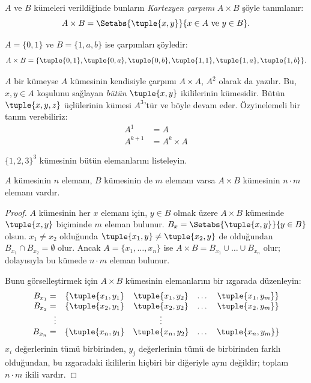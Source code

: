 \begin{defn}
$A$ ve $B$ kümeleri verildiğinde bunların \emph{Kartezyen çarpımı}
$A \times B$ şöyle tanımlanır:
\[
  A \times B = \Setabs{\tuple{x, y}}{x \in A \text{ ve } y \in B}.
\]
\end{defn}

\begin{ex}
$A = \{0, 1\}$ ve $B = \{1, a, b\}$ ise çarpımları şöyledir:
\[
A \times B = \{ \tuple{0, 1}, \tuple{0, a}, \tuple{0, b},
    \tuple{1, 1}, \tuple{1, a}, \tuple{1, b} \}.
\]
\end{ex}

\begin{ex}
$A$ bir kümeyse $A$ kümesinin kendisiyle çarpımı $A \times A$, $A^2$ olarak da
yazılır. Bu, $x, y \in A$ koşulunu sağlayan \emph{bütün}
$\tuple{x, y}$ ikililerinin kümesidir. Bütün $\tuple{x, y, z}$ üçlülerinin
kümesi $A^3$'tür ve böyle devam eder. Özyinelemeli bir tanım verebiliriz:
\begin{align*}
  A^1 & = A\\
  A^{k+1} & = A^k \times A
\end{align*}
\end{ex}

\begin{prob}
$\{1, 2, 3\}^3$ kümesinin bütün elemanlarını listeleyin.
\end{prob}

\begin{prop}
$A$ kümesinin $n$ elemanı, $B$ kümesinin de $m$ elemanı varsa $A \times B$
kümesinin $n\cdot m$ elemanı vardır.
\end{prop}

\begin{proof}
$A$ kümesinin her $x$ elemanı için, $y \in B$ olmak üzere $A \times B$
kümesinde $\tuple{x, y}$ biçiminde $m$ eleman bulunur.
$B_x = \Setabs{\tuple{x, y}}{y \in B}$ olsun. $x_1 \neq x_2$ olduğunda
$\tuple{x_1, y} \neq \tuple{x_2, y}$ de olduğundan
$B_{x_1} \cap B_{x_2} = \emptyset$ olur. Ancak
$A = \{x_1, \dots, x_n\}$ ise
$A \times B = B_{x_1} \cup \dots \cup B_{x_n}$ olur; dolayısıyla bu kümede
$n\cdot m$ eleman bulunur.

Bunu görselleştirmek için $A \times B$ kümesinin elemanlarını bir
ızgarada düzenleyin:
\[
\begin{array}{rcccc}
  B_{x_1} = & \{\tuple{x_1, y_1} & \tuple{x_1, y_2} & \dots & \tuple{x_1, y_m}\}\\
  B_{x_2} = & \{\tuple{x_2, y_1} & \tuple{x_2, y_2} & \dots & \tuple{x_2, y_m}\}\\
  \vdots & & \vdots\\
  B_{x_n} = & \{\tuple{x_n, y_1} & \tuple{x_n, y_2} & \dots & \tuple{x_n, y_m}\}
\end{array}
\]
$x_i$ değerlerinin tümü birbirinden, $y_j$ değerlerinin tümü de birbirinden
farklı olduğundan, bu ızgaradaki ikililerin hiçbiri bir diğeriyle aynı değildir;
toplam $n\cdot m$ ikili vardır.
\end{proof}

